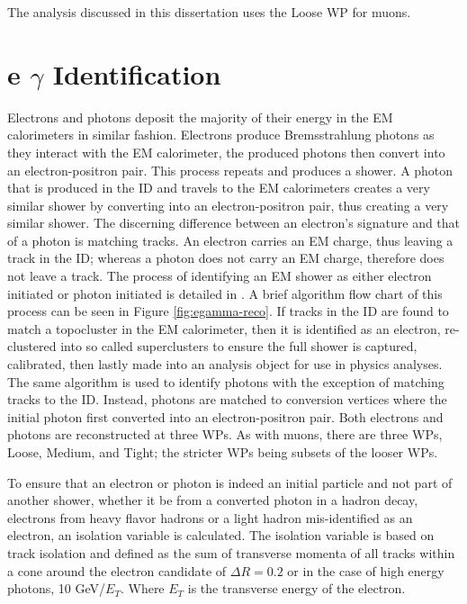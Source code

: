 	The analysis discussed in this dissertation uses the Loose WP for muons.


	\section{e $\gamma$ Identification}\label{sec:reco-egamma}
	Electrons and photons deposit the majority of their energy in the EM calorimeters in similar fashion. Electrons produce Bremsstrahlung photons as they interact with the EM calorimeter, the produced photons then convert into an electron-positron pair. This process repeats and produces a shower. A photon that is produced in the ID and travels to the EM calorimeters creates a very similar shower by converting into an electron-positron pair, thus creating a very similar shower. The discerning difference between an electron's signature and that of a photon is matching tracks. An electron carries an EM charge, thus leaving a track in the ID; whereas a photon does not carry an EM charge, therefore does not leave a track. The process of identifying an EM shower as either electron initiated or photon initiated is detailed in \cite{electron-perf}. A brief algorithm flow chart of this process can be seen in Figure \ref{fig:egamma-reco}. If tracks in the ID are found to match a topocluster in the EM calorimeter, then it is identified as an electron, re-clustered into so called superclusters to ensure the full shower is captured, calibrated, then lastly made into an analysis object for use in physics analyses. The same algorithm is used to identify photons with the exception of matching tracks to the ID. Instead, photons are matched to conversion vertices where the initial photon first converted into an electron-positron pair. Both electrons and photons are reconstructed at three WPs. As with muons, there are three WPs, Loose, Medium, and Tight; the stricter WPs being subsets of the looser WPs.

	To ensure that an electron or photon is indeed an initial particle and not part of another shower, whether it be from a converted photon in a hadron decay, electrons from heavy flavor hadrons or a light hadron mis-identified as an electron, an isolation variable is calculated. The isolation variable is based on track isolation and defined as the sum of transverse momenta of all tracks within a cone around the electron candidate of $\Delta R = 0.2$ or in the case of high energy photons, 10 GeV/$E_T$. Where $E_T$ is the transverse energy of the electron.

